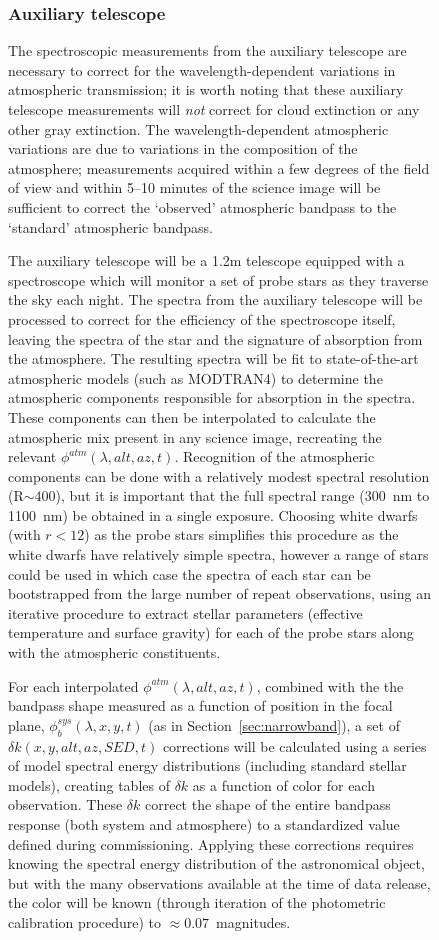 \documentclass[12pt,preprint]{aastex}
\begin{document}
\begin{figure}[htbp]
{\subsubsection{Auxiliary telescope}
\label{sec:auxtele}

The spectroscopic measurements from the auxiliary telescope are
necessary to correct for the wavelength-dependent variations in
atmospheric transmission; it is worth noting that these auxiliary
telescope measurements will {\it not} correct for cloud extinction or
any other gray extinction. The wavelength-dependent atmospheric
variations are due to variations in the composition of the atmosphere;
measurements acquired within a few degrees of the field of view and
within 5--10 minutes of the science image will be sufficient to
correct the `observed' atmospheric bandpass to the `standard'
atmospheric bandpass.

The auxiliary telescope will be a 1.2m telescope equipped with a
spectroscope which will monitor a set of probe stars as they traverse
the sky each night. The spectra from the auxiliary telescope will be
processed to correct for the efficiency of the spectroscope itself,
leaving the spectra of the star and the signature of absorption from
the atmosphere. The resulting spectra will be fit to state-of-the-art
atmospheric models (such as MODTRAN4) to determine the atmospheric
components responsible for absorption in the spectra. These components
can then be interpolated to calculate the atmospheric mix present in
any science image, recreating the relevant
$\phi^{atm}(\lambda,alt,az,t)$. Recognition of the atmospheric components
can be done with a relatively modest spectral resolution (R$\sim400$),
but it is important that the full spectral range (300~nm to 1100~nm)
be obtained in a single exposure. Choosing white dwarfs (with $r<12$)
as the probe stars simplifies this procedure as the white dwarfs have
relatively simple spectra, however a range of stars could be used in
which case the spectra of each star can be bootstrapped from the large
number of repeat observations, using an iterative procedure to extract
stellar parameters (effective temperature and surface gravity) for
each of the probe stars along with the atmospheric constituents. 

For each interpolated $\phi^{atm}(\lambda,alt,az,t)$, combined with
the the bandpass shape measured as a function of position in the focal
plane, $\phi_b^{sys}(\lambda,x,y,t)$ (as in Section~\ref{sec:narrowband}), a set of $\delta
k(x,y,alt,az,SED,t)$ corrections will be calculated using a series of model
spectral energy distributions (including standard
stellar models), creating tables of $\delta k$ as a
function of color for each observation. These $\delta k$ correct the shape of the entire
bandpass response (both system and atmosphere) to a standardized value
defined during commissioning. Applying these corrections requires knowing
the spectral energy distribution of the astronomical object, but with
the many observations available at the time of data release, the color
will be known (through iteration of the photometric calibration
procedure) to $\approx 0.07$~magnitudes.

}
\end{figure}
\end{document}
